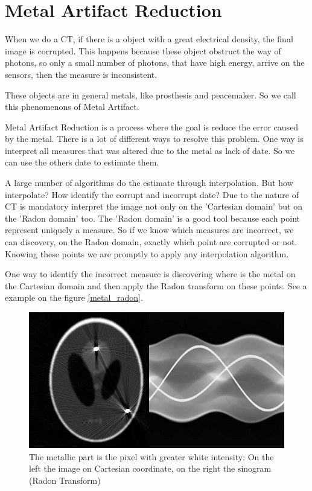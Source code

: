 \section{Metal Artifact Reduction}

When we do a CT, if there is a object with a great electrical density, the final image is corrupted. This happens because these object obstruct the way of photons, so only a small number of photons, that have high energy, arrive on the sensors, then the measure is inconsistent.

These objects are in general metals, like prosthesis and peacemaker. So we call this phenomenons of Metal Artifact.

Metal Artifact Reduction is a process where the goal is reduce the error caused by the metal. There is a lot of different ways to resolve this problem. One way is interpret all measures that was altered due to the metal as lack of date. So we can use the others date to estimate them.

A large number of algorithms do the estimate through interpolation. But how interpolate? How identify the corrupt and incorrupt date? Due to the nature of CT is mandatory interpret the image not only on the 'Cartesian domain' but on the 'Radon domain' too. The 'Radon domain' is a good tool because each point represent uniquely a measure. So if we know which measures are incorrect, we can discovery, on the Radon domain, exactly which point are corrupted or not. Knowing these points we are promptly to apply any interpolation algorithm.

One way to identify the incorrect measure is discovering where is the metal on the Cartesian domain and then apply the Radon transform on these points. See a example on the figure \eqref{metal_radon}.

\begin{figure}[h]
\centering
\includegraphics[scale=0.8]{img/metal_radon}
\caption{{The metallic part is the pixel with greater white intensity: On the left the image on Cartesian coordinate, on the right the sinogram (Radon Transform)}}\label{metal_radon}
\end{figure}

